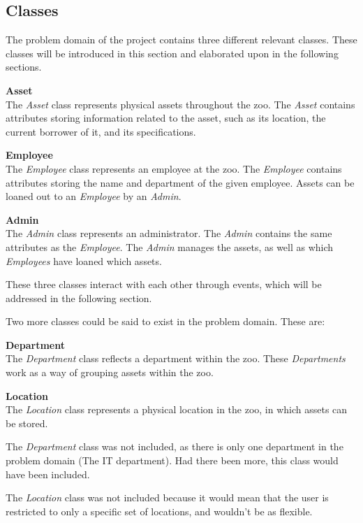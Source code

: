 \subsection{Classes}

The problem domain of the project contains three different relevant classes. These classes will be introduced in this section and elaborated upon in the following sections. 
\par

\textbf{Asset}\\
The \textit{Asset} class represents physical assets throughout the zoo. The \textit{Asset} contains attributes storing information related to the asset, such as its location, the current borrower of it, and its specifications.
\par

\textbf{Employee}\\
The \textit{Employee} class represents an employee at the zoo. The \textit{Employee} contains attributes storing the name and department of the given employee. Assets can be loaned out to an \textit{Employee} by an \textit{Admin}.
\par

\textbf{Admin}\\
The \textit{Admin} class represents an administrator. The \textit{Admin} contains the same attributes as the \textit{Employee}. The \textit{Admin} manages the assets, as well as which \textit{Employees} have loaned which assets.
\par
These three classes interact with each other through events, which will be addressed in the following section.
\newline

Two more classes could be said to exist in the problem domain. These are: 
\par
\textbf{Department}\\
The \textit{Department} class reflects a department within the zoo. These \textit{Departments} work as a way of grouping assets within the zoo.
\par

\textbf{Location}\\
The \textit{Location} class represents a physical location in the zoo, in which assets can be stored. 
\par

The \textit{Department} class was not included, as there is only one department in the problem domain (The IT department). Had there been more, this class would have been included. 
\par
The \textit{Location} class was not included because it would mean that the user is restricted to only a specific set of locations, and wouldn't be as flexible.